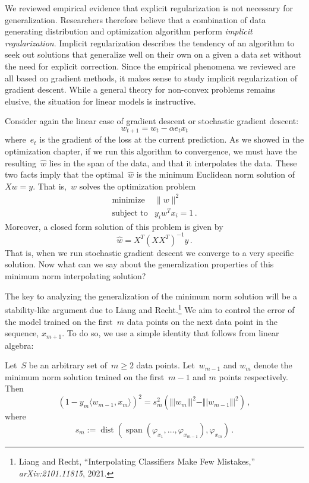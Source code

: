 \documentclass{tufte-book}
\begin{document}
We reviewed empirical evidence that explicit regularization is not
necessary for generalization. Researchers therefore believe that a
combination of data generating distribution and optimization algorithm
perform \emph{implicit regularization}. Implicit regularization
describes the tendency of an algorithm to seek out solutions that
generalize well on their own on a given a data set without the need for
explicit correction. Since the empirical phenomena we reviewed are all
based on gradient methods, it makes sense to study implicit
regularization of gradient descent. While a general theory for
non-convex problems remains elusive, the situation for linear models is
instructive.

Consider again the linear case of gradient descent or stochastic
gradient descent: \[
    w_{t+1} = w_t - \alpha e_t x_t
\] where~\(e_t\) is the gradient of the loss at the current prediction.
As we showed in the optimization chapter, if we run this algorithm to
convergence, we must have the resulting~\(\hat{w}\) lies in the span of
the data, and that it interpolates the data. These two facts imply that
the optimal~\(\hat{w}\) is the minimum Euclidean norm solution
of~\(Xw=y\). That is,~\(w\) solves the optimization problem \[
\begin{array}{ll}
    \text{minimize} & \|w\|^2\\
    \text{subject to} & y_i w^Tx_i = 1\,.
\end{array}
\] Moreover, a closed form solution of this problem is given by \[
    \hat{w}=X^T(XX^T)^{-1}y\,.
\] That is, when we run stochastic gradient descent we converge to a
very specific solution. Now what can we say about the generalization
properties of this minimum norm interpolating solution?

The key to analyzing the generalization of the minimum norm solution
will be a stability-like argument due to Liang and Recht.\footnote{Liang
  and Recht, {``Interpolating Classifiers Make Few Mistakes,''}
  \emph{arXiv:2101.11815}, 2021.} We aim to control the error of the
model trained on the first~\(m\) data points on the next data point in
the sequence, \(x_{m+1}\). To do so, we use a simple identity that
follows from linear algebra:

\begin{Lemma}

Let~\(S\) be an arbitrary set of~\(m\geq 2\) data points.
Let~\(w_{m-1}\) and \(w_{m}\) denote the minimum norm solution trained
on the first~\(m-1\) and \(m\) points respectively. Then \[
    (1-y_{m} \langle w_{m-1}, x_m \rangle)^2 = s_{m}^2 (\Vert| w_m \Vert|^2-\Vert| w_{m-1} \Vert|^2)\,,
\] where \[
    s_{m} := \operatorname{dist} \left(\operatorname{span}( \varphi_{x_1},\ldots, \varphi_{x_{m-1}}),\varphi_{x_{m}}\right)\,.
\]

\end{Lemma}
\end{document}

